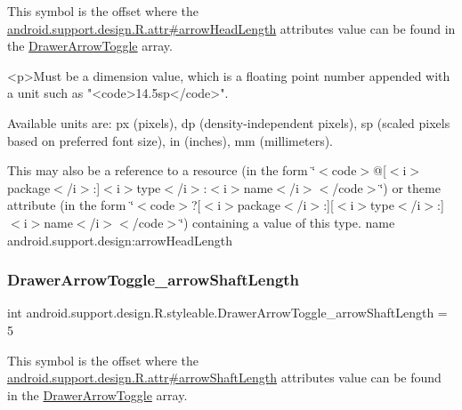 This symbol is the offset where the \hyperlink{classandroid_1_1support_1_1design_1_1R_1_1attr_a38f5d34b48537f094d8b501291c0c882}{android.\+support.\+design.\+R.\+attr\#arrow\+Head\+Length} attribute\textquotesingle{}s value can be found in the \hyperlink{classandroid_1_1support_1_1design_1_1R_1_1styleable_a559d22c78738e5161420dc4b41689c1b}{Drawer\+Arrow\+Toggle} array.

\begin{DoxyVerb}      <p>Must be a dimension value, which is a floating point number appended with a unit such as "<code>14.5sp</code>".
\end{DoxyVerb}
 Available units are\+: px (pixels), dp (density-\/independent pixels), sp (scaled pixels based on preferred font size), in (inches), mm (millimeters). 

This may also be a reference to a resource (in the form \char`\"{}$<$code$>$@\mbox{[}$<$i$>$package$<$/i$>$\+:\mbox{]}$<$i$>$type$<$/i$>$\+:$<$i$>$name$<$/i$>$$<$/code$>$\char`\"{}) or theme attribute (in the form \char`\"{}$<$code$>$?\mbox{[}$<$i$>$package$<$/i$>$\+:\mbox{]}\mbox{[}$<$i$>$type$<$/i$>$\+:\mbox{]}$<$i$>$name$<$/i$>$$<$/code$>$\char`\"{}) containing a value of this type.  name android.\+support.\+design\+:arrow\+Head\+Length \mbox{\label{classandroid_1_1support_1_1design_1_1R_1_1styleable_a2dca38b895260aa31773fd2f7f247438}} 
\subsubsection{\texorpdfstring{Drawer\+Arrow\+Toggle\+\_\+arrow\+Shaft\+Length}{DrawerArrowToggle\_arrowShaftLength}}
{\footnotesize\ttfamily int android.\+support.\+design.\+R.\+styleable.\+Drawer\+Arrow\+Toggle\+\_\+arrow\+Shaft\+Length = 5\hspace{0.3cm}{\ttfamily [static]}}

This symbol is the offset where the \hyperlink{classandroid_1_1support_1_1design_1_1R_1_1attr_a09d54a1db1a3a83fd7b444ad9a8942ea}{android.\+support.\+design.\+R.\+attr\#arrow\+Shaft\+Length} attribute\textquotesingle{}s value can be found in the \hyperlink{classandroid_1_1support_1_1design_1_1R_1_1styleable_a559d22c78738e5161420dc4b41689c1b}{Drawer\+Arrow\+Toggle} array.

